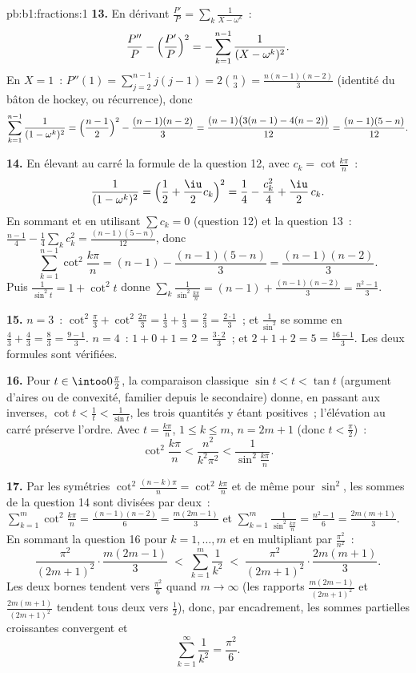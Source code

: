\begin{solution}{pb:b1:fractions:1}
\textbf{13.} En dérivant $\frac{P'}P = \sum_k\frac1{X -
\omega^k}$~:
\[
\frac{P''}P - \Bigl(\frac{P'}P\Bigr)^2
= -\sum_{k=1}^{n-1}\frac1{(X - \omega^k)^2} .
\]
En $X = 1$~: $P''(1) = \sum_{j=2}^{n-1}j(j-1) = 2\binom n3 =
\frac{n(n-1)(n-2)}3$ (identité du bâton de hockey, ou récurrence), donc
\[
\sum_{k=1}^{n-1}\frac1{(1 - \omega^k)^2}
= \Bigl(\frac{n-1}2\Bigr)^2 - \frac{(n-1)(n-2)}3
= \frac{(n-1)\bigl(3(n-1) - 4(n-2)\bigr)}{12}
= \frac{(n-1)(5-n)}{12} .
\]

\textbf{14.} En élevant au carré la formule de la question 12, avec
$c_k = \cot\frac{k\pi}n$~:
\[
\frac1{(1-\omega^k)^2}
= \Bigl(\frac12 + \frac\iu2 c_k\Bigr)^2
= \frac14 - \frac{c_k^2}4 + \frac\iu2\,c_k .
\]
En sommant et en utilisant $\sum c_k = 0$ (question 12) et la question
13~: $\frac{n-1}4 - \frac14\sum_k c_k^2 = \frac{(n-1)(5-n)}{12}$, donc
\[
\sum_{k=1}^{n-1}\cot^2\frac{k\pi}n
= (n-1) - \frac{(n-1)(5-n)}3 = \frac{(n-1)(n-2)}3 .
\]
Puis $\frac1{\sin^2t} = 1 + \cot^2t$ donne
$\sum_k\frac1{\sin^2\frac{k\pi}n} = (n-1) +
\frac{(n-1)(n-2)}3 = \frac{n^2-1}3$.

\textbf{15.} $n = 3$~: $\cot^2\frac\pi3 + \cot^2\frac{2\pi}3 =
\frac13 + \frac13 = \frac23 = \frac{2\cdot1}3$~; et
$\frac1{\sin^2} $ se somme en $\frac43 + \frac43 = \frac83 =
\frac{9-1}3$. $n = 4$~: $1 + 0 + 1 = 2 = \frac{3\cdot2}3$~; et $2
+ 1 + 2 = 5 = \frac{16-1}3$. Les deux formules sont vérifiées.

\textbf{16.} Pour $t \in \intoo0{\frac\pi2}$, la comparaison classique
$\sin t < t < \tan t$ (argument d'aires ou de convexité, familier depuis
le secondaire) donne, en passant aux inverses, $\cot t <
\frac1t < \frac1{\sin t}$, les trois quantités y étant positives~;
l'élévation au carré préserve l'ordre. Avec $t = \frac{k\pi}n$, $1 \leq
k \leq m$, $n = 2m+1$ (donc $t < \frac\pi2$)~:
\[
\cot^2\frac{k\pi}n < \frac{n^2}{k^2\pi^2} <
\frac1{\sin^2\frac{k\pi}n} .
\]

\textbf{17.} Par les symétries $\cot^2\frac{(n-k)\pi}n =
\cot^2\frac{k\pi}n$ et de même pour $\sin^2$, les sommes de la question
14 sont divisées par deux~: $\sum_{k=1}^{m}\cot^2\frac{k\pi}n =
\frac{(n-1)(n-2)}6 = \frac{m(2m-1)}3$ et
$\sum_{k=1}^m\frac1{\sin^2\frac{k\pi}n} = \frac{n^2-1}6 =
\frac{2m(m+1)}3$. En sommant la question 16 pour $k = 1, \dots, m$ et en
multipliant par $\frac{\pi^2}{n^2}$~:
\[
\frac{\pi^2}{(2m+1)^2}\cdot\frac{m(2m-1)}3
\;<\; \sum_{k=1}^{m}\frac1{k^2} \;<\;
\frac{\pi^2}{(2m+1)^2}\cdot\frac{2m(m+1)}3 .
\]
Les deux bornes tendent vers $\frac{\pi^2}6$ quand $m \to \infty$ (les
rapports $\frac{m(2m-1)}{(2m+1)^2}$ et $\frac{2m(m+1)}{(2m+1)^2}$ tendent
tous deux vers $\frac12$), donc, par encadrement, les sommes partielles
croissantes convergent et
\[
\sum_{k=1}^{\infty}\frac1{k^2} = \frac{\pi^2}6 .
\]


\end{solution}
